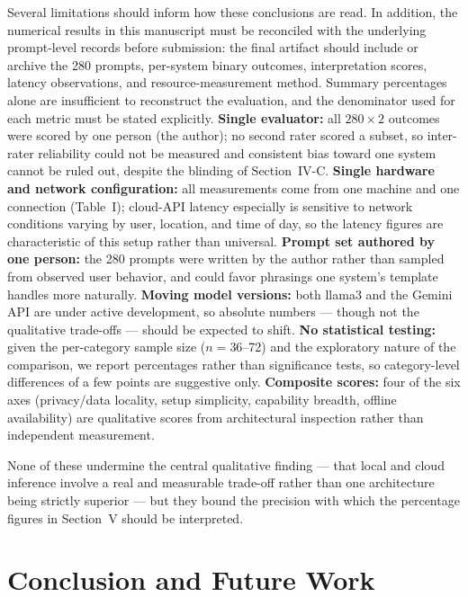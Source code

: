 \documentclass[conference]{IEEEtran}
\begin{document}
Several limitations should inform how these conclusions are read. In addition, the numerical results in this manuscript must be reconciled with the underlying prompt-level records before submission: the final artifact should include or archive the 280 prompts, per-system binary outcomes, interpretation scores, latency observations, and resource-measurement method. Summary percentages alone are insufficient to reconstruct the evaluation, and the denominator used for each metric must be stated explicitly. \textbf{Single evaluator:} all $280 \times 2$ outcomes were scored by one person (the author); no second rater scored a subset, so inter-rater reliability could not be measured and consistent bias toward one system cannot be ruled out, despite the blinding of Section~IV-C. \textbf{Single hardware and network configuration:} all measurements come from one machine and one connection (Table~I); cloud-API latency especially is sensitive to network conditions varying by user, location, and time of day, so the latency figures are characteristic of this setup rather than universal. \textbf{Prompt set authored by one person:} the 280 prompts were written by the author rather than sampled from observed user behavior, and could favor phrasings one system's template handles more naturally. \textbf{Moving model versions:} both llama3 and the Gemini API are under active development, so absolute numbers --- though not the qualitative trade-offs --- should be expected to shift. \textbf{No statistical testing:} given the per-category sample size ($n = 36$--72) and the exploratory nature of the comparison, we report percentages rather than significance tests, so category-level differences of a few points are suggestive only. \textbf{Composite scores:} four of the six axes (privacy/data locality, setup simplicity, capability breadth, offline availability) are qualitative scores from architectural inspection rather than independent measurement.

None of these undermine the central qualitative finding --- that local and cloud inference involve a real and measurable trade-off rather than one architecture being strictly superior --- but they bound the precision with which the percentage figures in Section~V should be interpreted.

\section{Conclusion and Future Work}
\end{document}
